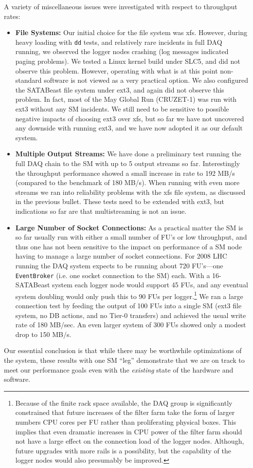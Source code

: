 A variety of miscellaneous issues were investigated with respect to throughput rates:
\begin{itemize}
  \item {\bf File Systems:}
Our initial choice for the file system was xfs.
However, during heavy loading with \verb+dd+ tests, and relatively rare incidents 
in full DAQ running,
we observed the logger nodes crashing (log messages indicated paging problems).
We tested a Linux kernel build under SLC5, and did not observe this problem.
However, operating with what is at this point non-standard software is not 
viewed as a very practical option.
We also configured the SATABeast file system under ext3, and again did not observe
this problem.
In fact, most of the May Global Run (CRUZET-1) was run  with  ext3
without any SM incidents.
We still need to  be sensitive to possible negative impacts of choosing  ext3 over xfs,
but so far we have not uncovered any downside with running  ext3,
and we have now adopted it as our default system.

  \item {\bf Multiple Output Streams:}
We have done a preliminary test running the full DAQ chain to the SM with 
up to 5 output streams so far.
Interestingly the throughput performance showed a small increase 
in rate to 192 MB/s (compared to the benchmark of 180 MB/s).
When running with even more streams we ran into reliability problems
with the xfs file system, as discussed in the previous bullet.
These tests need to be extended with ext3, but indications so far are
that multistreaming is not an issue.

 \item {\bf Large Number of Socket Connections:}
As a practical matter the SM is so far usually run with either a small number of FU's 
or  low throughput, and thus  one has  not been sensitive to the impact on performance 
of a SM node having to manage a large number of socket connections.
For 2008 LHC running the DAQ system expects to be running about 720 FU's---one
\verb+EventBroker+ (i.e. one socket connection to the SM) each.
With a 16-SATABeast system each logger node would support 45 FUs,
and any eventual system doubling would only push this 
to 90 FUs per logger.\footnote{Because of the finite rack space available, 
the DAQ group is significantly constrained that future increases of the filter farm take 
the form of larger numbers  CPU cores per FU rather than proliferating physical boxes.
This implies that even dramatic increases in CPU power of the filter farm
should not have a large effect on the connection load of the logger nodes.
Although, future upgrades with more rails is a possibility, but the capability
of the logger nodes would also presumably be improved.}
We ran a large connection test by feeding the output of 100 FUs into
a single SM (ext3 file system, no DB actions, and no Tier-0 transfers) and
achieved the usual write rate of 180 MB/sec.
An even larger system of 300 FUs showed only a modest drop to 150 MB/s.
\end{itemize}

Our essential conclusion is that while there may be worthwhile optimizations 
of the system, these results with one SM ``leg'' demonstrate that we are on track
to meet our performance goals even with the {\it existing}
state of the hardware and software.


